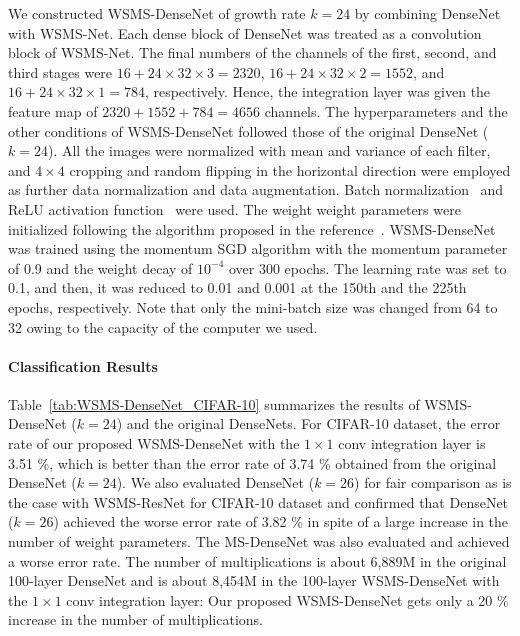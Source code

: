 \documentclass[journal]{IEEEtran}
\begin{document}
We constructed WSMS-DenseNet of growth rate $k=24$ by combining DenseNet with WSMS-Net.
Each dense block of DenseNet was treated as a convolution block of WSMS-Net.
The final numbers of the channels of the first, second, and third stages were $16+24\times32\times3=2320$, $16+24\times32\times2=1552$, and $16+24\times32\times1=784$, respectively.
Hence, the integration layer was given the feature map of $2320+1552+784=4656$ channels.
The hyperparameters and the other conditions of WSMS-DenseNet followed those of the original DenseNet ($k=24$).
All the images were normalized with mean and variance of each filter, and $4\times4$ cropping and random flipping in the horizontal direction were employed as further data normalization and data augmentation.
Batch normalization~\cite{Ioffe2015} and ReLU activation function~\cite{Nair2010} were used.
The weight weight parameters were initialized following the algorithm proposed in the reference~\cite{He2016a}.
WSMS-DenseNet was trained using the momentum SGD algorithm with the momentum parameter of 0.9 and the weight decay of $10^{-4}$ over 300 epochs.
The learning rate was set to 0.1, and then, it was reduced to 0.01 and 0.001 at the 150th and the 225th epochs, respectively.
Note that only the mini-batch size was changed from 64 to 32 owing to the capacity of the computer we used.


\paragraph*{\textbf{Classification Results}}

Table~\ref{tab:WSMS-DenseNet_CIFAR-10} summarizes the results of WSMS-DenseNet ($k=24$) and the original DenseNets.
For CIFAR-10 dataset, the error rate of our proposed WSMS-DenseNet with the $1\times1$ conv integration layer is 3.51 \%, which is better than the error rate of 3.74 \% obtained from the original DenseNet ($k=24$).
We also evaluated DenseNet ($k=26$) for fair comparison as is the case with WSMS-ResNet for CIFAR-10 dataset and confirmed that DenseNet ($k=26$) achieved the worse error rate of 3.82 \% in spite of a large increase in the number of weight parameters.
The MS-DenseNet was also evaluated and achieved a worse error rate.
The number of multiplications is about 6,889M in the original 100-layer DenseNet and is about 8,454M in the 100-layer WSMS-DenseNet with the $1\times1$ conv integration layer: Our proposed WSMS-DenseNet gets only a 20 \% increase in the number of multiplications.
\end{document}
